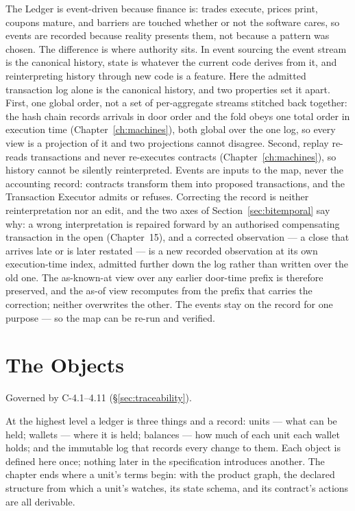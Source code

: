 \documentclass[11pt,a4paper]{article}
\begin{document}
The Ledger is
event-driven because finance is: trades execute, prices print, coupons mature, and
barriers are touched whether or not the software cares, so events are recorded because
reality presents them, not because a pattern was chosen. The difference is where authority
sits. In event sourcing the event stream is the canonical history, state is whatever the
current code derives from it, and reinterpreting history through new code is a feature.
Here the admitted transaction log alone is the canonical history, and two properties set it
apart. First, one global order, not a set of per-aggregate streams stitched back together:
the hash chain records arrivals in door order and the fold obeys one total order in
execution time (Chapter~\ref{ch:machines}), both global over the one log, so every view is a
projection of it and two projections cannot disagree. Second, replay re-reads transactions
and never re-executes contracts (Chapter~\ref{ch:machines}), so history cannot be silently
reinterpreted. Events are inputs to the map, never the accounting record: contracts
transform them into proposed transactions, and the Transaction Executor admits or refuses.
Correcting the record is neither reinterpretation nor an edit, and the two axes of
Section~\ref{sec:bitemporal} say why: a wrong interpretation is repaired forward by an
authorised compensating transaction in the open (Chapter~15), and a corrected observation
--- a close that arrives late or is later restated --- is a new recorded observation at its
own execution-time index, admitted further down the log rather than written over the old
one. The as-known-at view over any earlier door-time prefix is therefore preserved, and the
as-of view recomputes from the prefix that carries the correction; neither overwrites the
other. The events stay on the record for one purpose --- so the map can be re-run and
verified.


\section{The Objects}\label{ch:objects}

Governed by C-4.1--4.11 (\S\ref{sec:traceability}).

At the highest level a ledger is three things and a record: units --- what can be held;
wallets --- where it is held; balances --- how much of each unit each wallet holds; and
the immutable log that records every change to them. Each object is defined here once;
nothing later in the specification introduces another. The chapter ends where a unit's
terms begin: with the product graph, the declared structure from which a unit's watches,
its state schema, and its contract's actions are all derivable.
\end{document}
